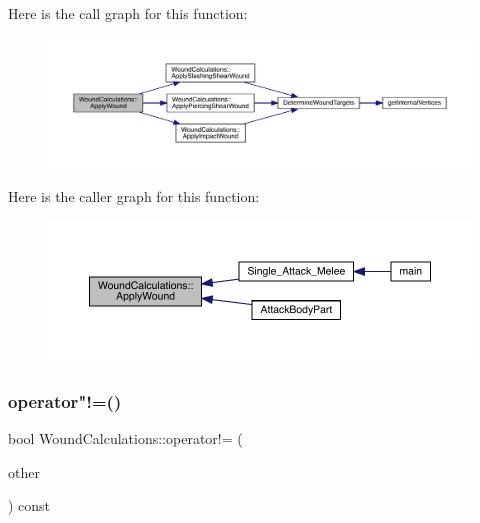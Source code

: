 Here is the call graph for this function\+:
\nopagebreak
\begin{figure}[H]
\begin{center}
\leavevmode
\includegraphics[width=350pt]{db/d1e/class_wound_calculations_a8143ba01702cf1a1072d17ee7deab4e0_cgraph}
\end{center}
\end{figure}
Here is the caller graph for this function\+:
\nopagebreak
\begin{figure}[H]
\begin{center}
\leavevmode
\includegraphics[width=350pt]{db/d1e/class_wound_calculations_a8143ba01702cf1a1072d17ee7deab4e0_icgraph}
\end{center}
\end{figure}
\mbox{\label{class_wound_calculations_ad2b94568adacf5e0d0ede9fa639de88c}} 
\subsubsection{\texorpdfstring{operator"!=()}{operator!=()}}
{\footnotesize\ttfamily bool Wound\+Calculations\+::operator!= (\begin{DoxyParamCaption}\item[{\mbox{\hyperlink{class_wound_calculations}{Wound\+Calculations}} \&}]{other }\end{DoxyParamCaption}) const}

\mbox{\label{class_wound_calculations_a539972ef16a667af23ccdd51246277f3}} 
